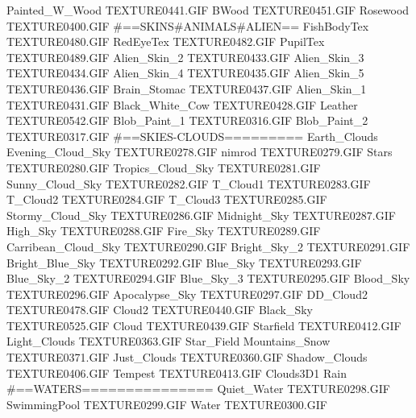 Painted_W_Wood                 TEXTURE\TEX0441.GIF
BWood                          TEXTURE\TEX0451.GIF
Rosewood                       TEXTURE\TEX0400.GIF
#==SKINS#ANIMALS#ALIEN==
FishBodyTex                    TEXTURE\TEX0480.GIF
RedEyeTex                      TEXTURE\TEX0482.GIF
PupilTex                       TEXTURE\TEX0489.GIF
Alien_Skin_2                   TEXTURE\TEX0433.GIF
Alien_Skin_3                   TEXTURE\TEX0434.GIF
Alien_Skin_4                   TEXTURE\TEX0435.GIF
Alien_Skin_5                   TEXTURE\TEX0436.GIF
Brain_Stomac                   TEXTURE\TEX0437.GIF
Alien_Skin_1                   TEXTURE\TEX0431.GIF
Black_White_Cow                TEXTURE\TEX0428.GIF
Leather                        TEXTURE\TEX0542.GIF
Blob_Paint_1                   TEXTURE\TEX0316.GIF
Blob_Paint_2                   TEXTURE\TEX0317.GIF
#==SKIES-CLOUDS=========
Earth_Clouds
Evening_Cloud_Sky              TEXTURE\TEX0278.GIF
nimrod                         TEXTURE\TEX0279.GIF
Stars                          TEXTURE\TEX0280.GIF
Tropics_Cloud_Sky              TEXTURE\TEX0281.GIF
Sunny_Cloud_Sky                TEXTURE\TEX0282.GIF
T_Cloud1                       TEXTURE\TEX0283.GIF
T_Cloud2                       TEXTURE\TEX0284.GIF
T_Cloud3                       TEXTURE\TEX0285.GIF
Stormy_Cloud_Sky               TEXTURE\TEX0286.GIF
Midnight_Sky                   TEXTURE\TEX0287.GIF
High_Sky                       TEXTURE\TEX0288.GIF
Fire_Sky                       TEXTURE\TEX0289.GIF
Carribean_Cloud_Sky            TEXTURE\TEX0290.GIF
Bright_Sky_2                   TEXTURE\TEX0291.GIF
Bright_Blue_Sky                TEXTURE\TEX0292.GIF
Blue_Sky                       TEXTURE\TEX0293.GIF
Blue_Sky_2                     TEXTURE\TEX0294.GIF
Blue_Sky_3                     TEXTURE\TEX0295.GIF
Blood_Sky                      TEXTURE\TEX0296.GIF
Apocalypse_Sky                 TEXTURE\TEX0297.GIF
DD_Cloud2                      TEXTURE\TEX0478.GIF
Cloud2                         TEXTURE\TEX0440.GIF
Black_Sky                      TEXTURE\TEX0525.GIF
Cloud                          TEXTURE\TEX0439.GIF
Starfield                      TEXTURE\TEX0412.GIF
Light_Clouds                   TEXTURE\TEX0363.GIF
Star_Field
Mountains_Snow                 TEXTURE\TEX0371.GIF
Just_Clouds                    TEXTURE\TEX0360.GIF
Shadow_Clouds                  TEXTURE\TEX0406.GIF
Tempest                        TEXTURE\TEX0413.GIF
Clouds3D1
Rain
#==WATERS===============
Quiet_Water                    TEXTURE\TEX0298.GIF
SwimmingPool                   TEXTURE\TEX0299.GIF
Water                          TEXTURE\TEX0300.GIF
